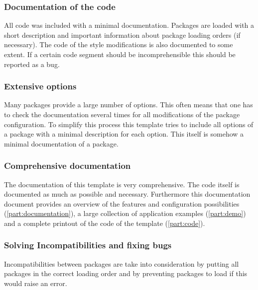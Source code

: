 \subsubsection{Documentation of the code}
\label{sec:doc:features:template:doc(code)}
All code was included with a minimal documentation. Packages are loaded with a short description and important information about package loading orders (if necessary). The code of the style modifications is also documented to some extent. If a certain code segment should be incomprehensible this should be reported as a bug.

\subsubsection{Extensive options}
\label{sec:doc:features:template:options}
Many packages provide a large number of options. This often means that one has to check the documentation several times for all modifications of the package configuration. To simplify this process this template tries to include all options of a package with a minimal description for each option. This itself is somehow a minimal documentation of a package.

\subsubsection{Comprehensive documentation}
\label{sec:doc:features:template:doc(template)}
The documentation of this template is very comprehensive. The code itself is documented as much as possible and necessary. Furthermore this documentation document provides an overview of the features and configuration possibilities (\cref{part:documentation}), a large collection of \latex application examples (\cref{part:demo}) and a complete printout of the code of the template (\cref{part:code}).

\subsubsection{Solving Incompatibilities and fixing bugs}
\label{sec:doc:features:template:bugs}
Incompatibilities between packages are take into consideration by putting all packages in the correct loading order and by preventing packages to load if this would raise an error.

